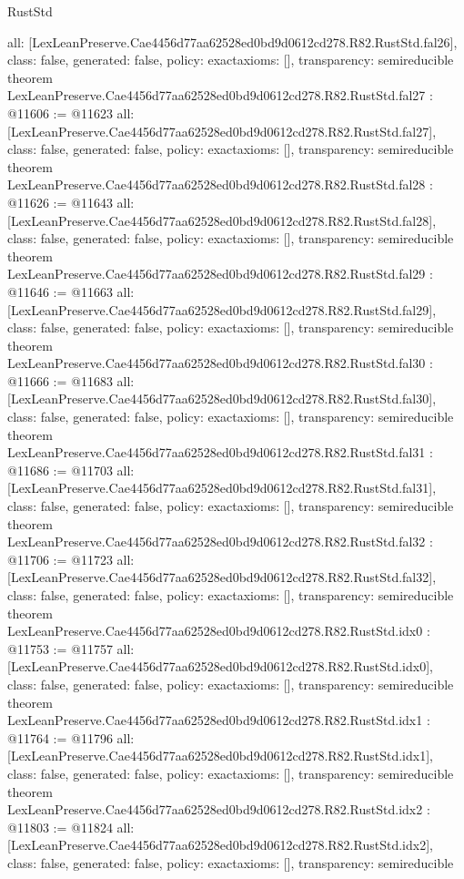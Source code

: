 \begin{lexlean}{RustStd}
\begin{coremodule}
{  all: [LexLeanPreserve.Cae4456d77aa62528ed0bd9d0612cd278.R82.RustStd.fal26],
  class: false,
  generated: false,
  policy: exact{axioms: []},
  transparency: semireducible
}
theorem LexLeanPreserve.Cae4456d77aa62528ed0bd9d0612cd278.R82.RustStd.fal27 : @11606 := @11623 {
  all: [LexLeanPreserve.Cae4456d77aa62528ed0bd9d0612cd278.R82.RustStd.fal27],
  class: false,
  generated: false,
  policy: exact{axioms: []},
  transparency: semireducible
}
theorem LexLeanPreserve.Cae4456d77aa62528ed0bd9d0612cd278.R82.RustStd.fal28 : @11626 := @11643 {
  all: [LexLeanPreserve.Cae4456d77aa62528ed0bd9d0612cd278.R82.RustStd.fal28],
  class: false,
  generated: false,
  policy: exact{axioms: []},
  transparency: semireducible
}
theorem LexLeanPreserve.Cae4456d77aa62528ed0bd9d0612cd278.R82.RustStd.fal29 : @11646 := @11663 {
  all: [LexLeanPreserve.Cae4456d77aa62528ed0bd9d0612cd278.R82.RustStd.fal29],
  class: false,
  generated: false,
  policy: exact{axioms: []},
  transparency: semireducible
}
theorem LexLeanPreserve.Cae4456d77aa62528ed0bd9d0612cd278.R82.RustStd.fal30 : @11666 := @11683 {
  all: [LexLeanPreserve.Cae4456d77aa62528ed0bd9d0612cd278.R82.RustStd.fal30],
  class: false,
  generated: false,
  policy: exact{axioms: []},
  transparency: semireducible
}
theorem LexLeanPreserve.Cae4456d77aa62528ed0bd9d0612cd278.R82.RustStd.fal31 : @11686 := @11703 {
  all: [LexLeanPreserve.Cae4456d77aa62528ed0bd9d0612cd278.R82.RustStd.fal31],
  class: false,
  generated: false,
  policy: exact{axioms: []},
  transparency: semireducible
}
theorem LexLeanPreserve.Cae4456d77aa62528ed0bd9d0612cd278.R82.RustStd.fal32 : @11706 := @11723 {
  all: [LexLeanPreserve.Cae4456d77aa62528ed0bd9d0612cd278.R82.RustStd.fal32],
  class: false,
  generated: false,
  policy: exact{axioms: []},
  transparency: semireducible
}
theorem LexLeanPreserve.Cae4456d77aa62528ed0bd9d0612cd278.R82.RustStd.idx0 : @11753 := @11757 {
  all: [LexLeanPreserve.Cae4456d77aa62528ed0bd9d0612cd278.R82.RustStd.idx0],
  class: false,
  generated: false,
  policy: exact{axioms: []},
  transparency: semireducible
}
theorem LexLeanPreserve.Cae4456d77aa62528ed0bd9d0612cd278.R82.RustStd.idx1 : @11764 := @11796 {
  all: [LexLeanPreserve.Cae4456d77aa62528ed0bd9d0612cd278.R82.RustStd.idx1],
  class: false,
  generated: false,
  policy: exact{axioms: []},
  transparency: semireducible
}
theorem LexLeanPreserve.Cae4456d77aa62528ed0bd9d0612cd278.R82.RustStd.idx2 : @11803 := @11824 {
  all: [LexLeanPreserve.Cae4456d77aa62528ed0bd9d0612cd278.R82.RustStd.idx2],
  class: false,
  generated: false,
  policy: exact{axioms: []},
  transparency: semireducible
}
\end{coremodule}
\end{lexlean}
